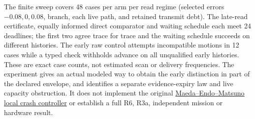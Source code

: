 \documentclass{article}
\begin{document}
The finite sweep covers 48 cases per arm per read regime
(selected errors $-0.08,0,0.08$, branch, each live path, and
retained transmit debt). The late-read certificate, equally
informed direct comparator and waiting schedule each meet
24 deadlines; the first two agree trace for trace and the waiting
schedule succeeds on different histories. The early raw control
attempts incompatible motions in 12 cases while a typed check
withholds advance on all unqualified early histories. These
are exact case counts, not estimated scan or delivery frequencies.
The experiment gives an actual modeled way to obtain the
early distinction in part of the declared envelope, and identifies
a separate evidence-expiry law and live capacity obstruction.
It does not implement the original
\href{https://en.endo-lab.jp/research/detail/499}
{Maeda--Endo--Matsuno local crash controller} or establish
a full R6, R3a, independent mission or hardware result.
\end{document}

